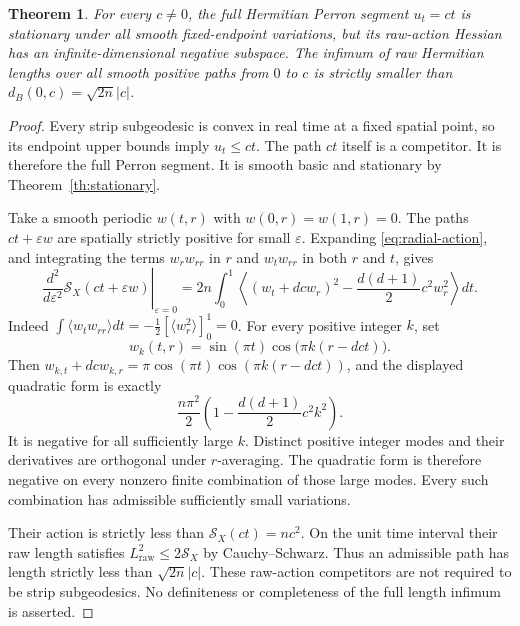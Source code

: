 \documentclass[11pt]{article}
\newtheorem{theorem}{Theorem}
\theoremstyle{remark}\newtheorem{remark}[theorem]{Remark}
\begin{document}
\begin{theorem}\label{th:saddle}
For every $c\ne0$, the full Hermitian Perron segment $u_t=ct$ is
stationary under all smooth fixed-endpoint variations, but its raw-action
Hessian has an infinite-dimensional negative subspace.
The infimum of raw Hermitian lengths over all smooth positive paths
from $0$ to $c$ is strictly smaller than $d_B(0,c)=\sqrt{2n}|c|$.
\end{theorem}
\begin{proof}
Every strip subgeodesic is convex in real time at a fixed spatial point,
so its endpoint upper bounds imply $u_t\leq ct$. The path $ct$ itself
is a competitor. It is therefore the full Perron segment.
It is smooth basic and stationary by Theorem~\ref{th:stationary}.

Take a smooth periodic $w(t,r)$ with $w(0,r)=w(1,r)=0$.
The paths $ct+\varepsilon w$ are spatially strictly positive for small
$\varepsilon$. Expanding \eqref{eq:radial-action}, and integrating the
terms $w_rw_{rr}$ in $r$ and $w_tw_{rr}$ in both $r$ and $t$, gives
\[
 \left.\frac{d^2}{d\varepsilon^2}\mathcal S_X(ct+\varepsilon w)
 \right|_{\varepsilon=0}
 =2n\int_0^1\left\langle
       (w_t+dcw_r)^2-\frac{d(d+1)}2c^2w_r^2
                    \right\rangle dt.
\]
Indeed $\int\langle w_tw_{rr}\rangle dt
=-\frac12[\langle w_r^2\rangle]_0^1=0$.
For every positive integer $k$, set
\[
 w_k(t,r)=\sin(\pi t)\cos\bigl(\pi k(r-dct)\bigr).
\]
Then $w_{k,t}+dcw_{k,r}=\pi\cos(\pi t)\cos(\pi k(r-dct))$,
and the displayed quadratic form is exactly
\begin{equation}\label{eq:saddle-mode}
 \frac{n\pi^2}{2}\left(1-\frac{d(d+1)}2c^2k^2\right).
\end{equation}
It is negative for all sufficiently large $k$. Distinct positive
integer modes and their derivatives are orthogonal under $r$-averaging.
The quadratic form is therefore negative on every nonzero finite
combination of those large modes.
Every such combination has admissible sufficiently small variations.

Their action is strictly less than $\mathcal S_X(ct)=nc^2$.
On the unit time interval their raw length satisfies
$L_{\mathrm{raw}}^2\leq2\mathcal S_X$ by Cauchy--Schwarz.
Thus an admissible path has length strictly less than $\sqrt{2n}|c|$.
These raw-action competitors are not required to be strip subgeodesics.
No definiteness or completeness of the full length infimum is asserted.
\end{proof}
\end{document}
